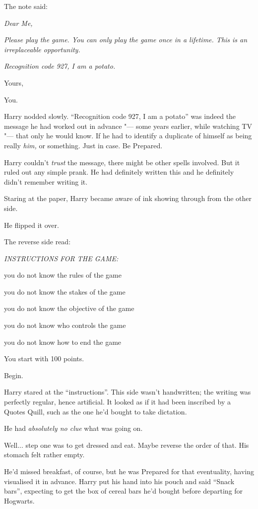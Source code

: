 The note said:

\emph{Dear Me,}

\emph{Please play the game. You can only play the game once in a
lifetime. This is an irreplaceable opportunity.}

\emph{Recognition code 927, I am a potato.}

Yours,

You.

Harry nodded slowly. ``Recognition code 927, I am a potato'' was indeed
the message he had worked out in advance "--- some years earlier, while
watching TV "--- that only he would know. If he had to identify a duplicate
of himself as being really \emph{him,} or something. Just in case. Be
Prepared.

Harry couldn't \emph{trust} the message, there might be other spells
involved. But it ruled out any simple prank. He had definitely written
this and he definitely didn't remember writing it.

Staring at the paper, Harry became aware of ink showing through from the
other side.

He flipped it over.

The reverse side read:

\emph{INSTRUCTIONS FOR THE GAME:}

you do not know the rules of the game

you do not know the stakes of the game

you do not know the objective of the game

you do not know who controls the game

you do not know how to end the game

You start with 100 points.

Begin.

Harry stared at the ``instructions''. This side wasn't handwritten; the
writing was perfectly regular, hence artificial. It looked as if it had
been inscribed by a Quotes Quill, such as the one he'd bought to take
dictation.

He had \emph{absolutely no clue} what was going on.

Well... step one was to get dressed and eat. Maybe reverse the
order of that. His stomach felt rather empty.

He'd missed breakfast, of course, but he was Prepared for that
eventuality, having visualised it in advance. Harry put his hand into
his pouch and said ``Snack bars'', expecting to get the box of cereal
bars he'd bought before departing for Hogwarts.


